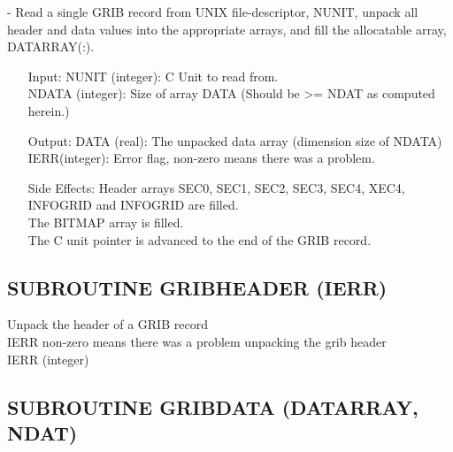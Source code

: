    - Read a single GRIB record from UNIX file-descriptor, NUNIT, unpack  
        all header and data values into the appropriate arrays, and fill the allocatable array,   
        DATARRAY(:).   
\begin{itemize}        
 \item[ Input:]
    NUNIT (integer):  C Unit to read from.                                             \\
    NDATA (integer):  Size of array DATA (Should be >= NDAT as computed herein.)       
                                                                             
  \item[ Output:  ]                                                                   
    DATA (real):  The unpacked data array (dimension size of NDATA)    \\
    IERR(integer):  Error flag, non-zero means there was a problem.                   
                                                                             
  \item[Side Effects: ]                                                              
     Header arrays SEC0, SEC1, SEC2, SEC3, SEC4, XEC4, INFOGRID and         
        INFOGRID are filled.                    \\                               
    The BITMAP array is filled.                 \\                           
    The C unit pointer is advanced to the end of the GRIB record.  \\

\end{itemize}

\subsection{SUBROUTINE GRIBHEADER (IERR)}
                                         
Unpack the header of a GRIB record \\
IERR non-zero means there was a problem unpacking the grib header\\
IERR (integer)\\

\subsection{ SUBROUTINE GRIBDATA (DATARRAY, NDAT)    }
                                 
